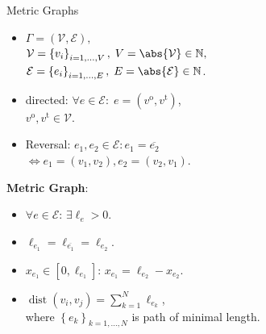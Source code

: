 \documentclass[9pt]{beamer}
\begin{document}
\begin{frame}{Metric Graphs}
    \begin{minipage}{0.5\textwidth}
        \begin{itemize}
            \item $\Gamma = \left(\mathcal{V}, \mathcal{E} \right),$ \\ $\mathcal{V} = \left\{ v_i \right\}_{i = 1, \ldots, V}, \; V = \abs{\mathcal{V}} \in \mathbb{N},$ \\
            $\mathcal{E} = \left\{ e_i \right\}_{i = 1, \ldots, E}, \; E = \abs{\mathcal{E}} \in \mathbb{N}$.
            \item directed: $\forall e \in \mathcal{E} \colon \; e = \left( v^{\operatorname{o}}, v^{\operatorname{t}} \right)$, \\
            $v^{\operatorname{o}}, v^{\operatorname{t}} \in \mathcal{V}$.
            \item Reversal: $e_1, e_2 \in \mathcal{E} \colon e_1 = \overline{e_2}$ \\
            $\Leftrightarrow e_1 = \left( v_1, v_2 \right), e_2 = \left( v_2, v_1 \right)$.
        \end{itemize}
        \vspace{3mm}
        \textbf{Metric Graph}:
        \begin{itemize}
            \item $\forall e \in \mathcal{E} \colon \, \exists \ell_e > 0$.
            \item $\ell_{e_1} = \ell_{\overline{e_1}} = \ell_{e_2}$.
            \item $x_{e_1} \in [0, \ell_{e_1}] \colon \, x_{e_1} = \ell_{e_2} - x_{e_2}$.
            \item $\operatorname{dist}(v_i, v_j) = \sum^{N}_{k = 1} \ell_{e_k}$, \\ where $\left\{ e_k \right\}_{k = 1, \ldots, N}$ is path of minimal length.
        \end{itemize}
    \end{minipage} \hfill
    \begin{minipage}{0.45\textwidth}
        \begin{figure}[H]
            \resizebox{40mm}{40mm}
            {
                }
\end{figure}
\end{minipage}
\end{frame}
\end{document}
